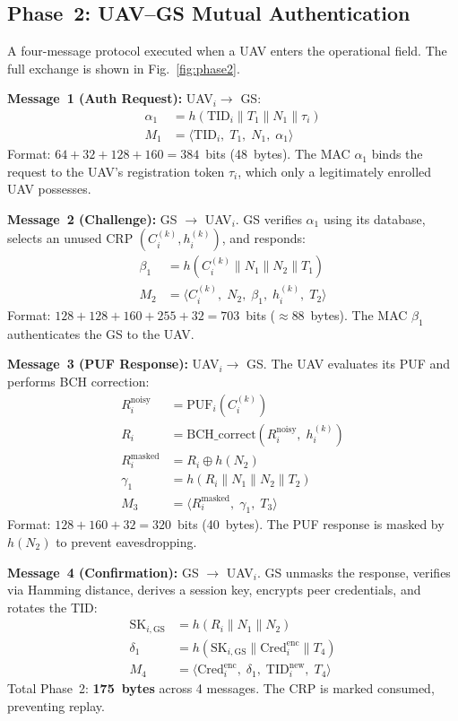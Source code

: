 \documentclass[conference]{IEEEtran}
\begin{document}
\subsection{Phase~2: UAV--GS Mutual Authentication}
A four-message protocol executed when a UAV enters the operational field. The full exchange is shown in Fig.~\ref{fig:phase2}.

\textbf{Message~1 (Auth Request):} UAV$_i \to$ GS:
\begin{align}
\alpha_1 &= h(\text{TID}_i \| T_1 \| N_1 \| \tau_i) \label{eq:m1_mac}\\
M_1 &= \langle \text{TID}_i,\; T_1,\; N_1,\; \alpha_1 \rangle \label{eq:m1}
\end{align}
Format: $64 + 32 + 128 + 160 = 384$~bits (48~bytes). The MAC $\alpha_1$ binds the request to the UAV's registration token $\tau_i$, which only a legitimately enrolled UAV possesses.

\textbf{Message~2 (Challenge):} GS $\to$ UAV$_i$. GS verifies $\alpha_1$ using its database, selects an unused CRP $(C_i^{(k)}, h_i^{(k)})$, and responds:
\begin{align}
\beta_1 &= h(C_i^{(k)} \| N_1 \| N_2 \| T_1) \label{eq:m2_mac}\\
M_2 &= \langle C_i^{(k)},\; N_2,\; \beta_1,\; h_i^{(k)},\; T_2 \rangle \label{eq:m2}
\end{align}
Format: $128 + 128 + 160 + 255 + 32 = 703$~bits ($\approx$88~bytes). The MAC $\beta_1$ authenticates the GS to the UAV.

\textbf{Message~3 (PUF Response):} UAV$_i \to$ GS. The UAV evaluates its PUF and performs BCH correction:
\begin{align}
R_i^{\text{noisy}} &= \text{PUF}_i(C_i^{(k)}) \\
R_i &= \text{BCH\_correct}(R_i^{\text{noisy}},\; h_i^{(k)}) \\
R_i^{\text{masked}} &= R_i \oplus h(N_2) \label{eq:mask_resp}\\
\gamma_1 &= h(R_i \| N_1 \| N_2 \| T_2) \label{eq:m3_mac}\\
M_3 &= \langle R_i^{\text{masked}},\; \gamma_1,\; T_3 \rangle \label{eq:m3}
\end{align}
Format: $128 + 160 + 32 = 320$~bits (40~bytes). The PUF response is masked by $h(N_2)$ to prevent eavesdropping.

\textbf{Message~4 (Confirmation):} GS $\to$ UAV$_i$. GS unmasks the response, verifies via Hamming distance, derives a session key, encrypts peer credentials, and rotates the TID:
\begin{align}
\text{SK}_{i,\text{GS}} &= h(R_i \| N_1 \| N_2) \label{eq:sk_gs}\\
\delta_1 &= h(\text{SK}_{i,\text{GS}} \| \text{Cred}_i^{\text{enc}} \| T_4) \label{eq:m4_mac}\\
M_4 &= \langle \text{Cred}_i^{\text{enc}},\; \delta_1,\; \text{TID}_i^{\text{new}},\; T_4 \rangle \label{eq:m4}
\end{align}
Total Phase~2: \textbf{175~bytes} across 4 messages. The CRP is marked consumed, preventing replay.
\end{document}
